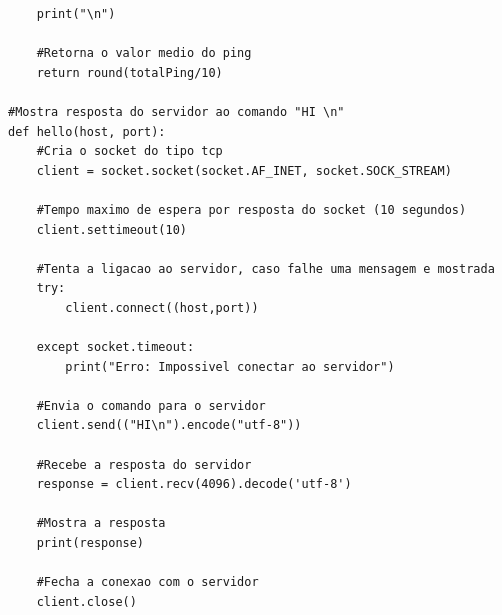 \documentclass{report}
\begin{document}
\begin{lstlisting}
    print("\n")

    #Retorna o valor medio do ping
    return round(totalPing/10)

#Mostra resposta do servidor ao comando "HI \n"
def hello(host, port):
    #Cria o socket do tipo tcp
    client = socket.socket(socket.AF_INET, socket.SOCK_STREAM)

    #Tempo maximo de espera por resposta do socket (10 segundos)
    client.settimeout(10)

    #Tenta a ligacao ao servidor, caso falhe uma mensagem e mostrada
    try:
        client.connect((host,port))

    except socket.timeout:
        print("Erro: Impossivel conectar ao servidor")

    #Envia o comando para o servidor    
    client.send(("HI\n").encode("utf-8"))

    #Recebe a resposta do servidor
    response = client.recv(4096).decode('utf-8')

    #Mostra a resposta
    print(response)

    #Fecha a conexao com o servidor
    client.close()

\end{lstlisting}
\end{document}

